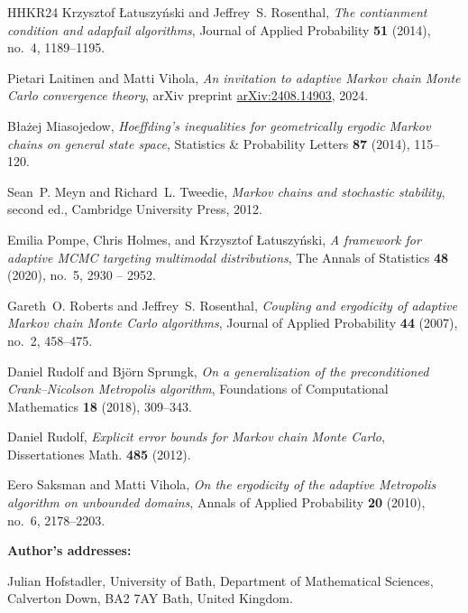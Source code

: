 \documentclass[12pt]{article}
\theoremstyle{definition}
\begin{document}
\begin{thebibliography}{HHKR24}
	Krzysztof {\L}atuszy{\'n}ski and Jeffrey~S. Rosenthal, \emph{The contianment
		condition and adapfail algorithms}, Journal of Applied Probability
	\textbf{51} (2014), no.~4, 1189--1195.
	
	Pietari Laitinen and Matti Vihola, \emph{An invitation to adaptive Markov chain
		Monte Carlo convergence theory}, arXiv preprint
	\href{https://arxiv.org/abs/2408.14903}{arXiv:2408.14903}, 2024.
	
	B{\l}a{\.z}ej Miasojedow, \emph{Hoeffding’s inequalities for geometrically
		ergodic {M}arkov chains on general state space}, Statistics \& Probability
	Letters \textbf{87} (2014), 115--120.
	
	Sean~P. Meyn and Richard~L. Tweedie, \emph{Markov chains and stochastic
		stability}, second ed., Cambridge University Press, 2012.
	
	Emilia Pompe, Chris Holmes, and Krzysztof {\L}atuszy{\'n}ski, \emph{{A
			framework for adaptive MCMC targeting multimodal distributions}}, The Annals
	of Statistics \textbf{48} (2020), no.~5, 2930 -- 2952.
	
	Gareth~O. Roberts and Jeffrey~S. Rosenthal, \emph{Coupling and ergodicity of
		adaptive Markov chain Monte Carlo algorithms}, Journal of Applied Probability
	\textbf{44} (2007), no.~2, 458--475.
	
	Daniel Rudolf and Bj{\"o}rn Sprungk, \emph{On a generalization of the
		preconditioned Crank--Nicolson Metropolis algorithm}, Foundations of
	Computational Mathematics \textbf{18} (2018), 309--343.
	
	Daniel Rudolf, \emph{{Explicit error bounds for Markov chain Monte Carlo}},
	Dissertationes Math. \textbf{485} (2012).
	
	Eero Saksman and Matti Vihola, \emph{{On the ergodicity of the adaptive
			Metropolis algorithm on unbounded domains}}, Annals of Applied Probability
	\textbf{20} (2010), no.~6, 2178--2203.
	
\end{thebibliography}


\noindent
\textbf{Author's addresses:}

\noindent
Julian Hofstadler, University of Bath, Department of Mathematical Sciences, Calverton Down, BA2 7AY Bath, United Kingdom. 
\end{document}
